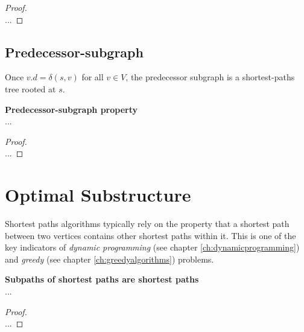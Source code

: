 \begin{proof} \textnormal{\cite[p.~673, thm. 24.15]{clrs}} \\
	...
\end{proof}

\subsection{Predecessor-subgraph}
Once $v.d = \delta(s, v)$ for all $v \in V$, the predecessor subgraph is a
shortest-paths tree rooted at $s$.
\begin{lemma}
	\textbf{Predecessor-subgraph property} \\
	...
\end{lemma}

\begin{proof} \textnormal{\cite[p.~?, thm. 24.16]{clrs}} \\
	...
\end{proof}

\newpage
\section{Optimal Substructure}
Shortest paths algorithms typically rely on the property that a shortest path
between two vertices contains other shortest paths within it. This is one of
the key indicators of \textit{dynamic programming} (see chapter
\ref{ch:dynamicprogramming}) and \textit{greedy} (see chapter
\ref{ch:greedyalgorithms}) problems.

\begin{lemma}
	\textbf{Subpaths of shortest paths are shortest paths} \\
	...
\end{lemma} 

\begin{proof} \textnormal{\cite[p.~645, thm.~24.1]{clrs}} \\
	...
\end{proof}

